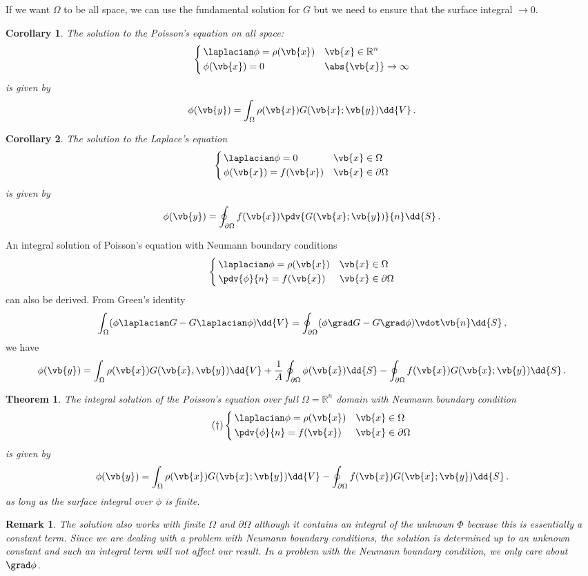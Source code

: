\documentclass{article}
\theoremstyle{plain}\theoremheaderfont{\normalfont\itshape}\theorembodyfont{\rmfamily}\theoremseparator{.}\newtheorem*{rem}{Remark}\newtheorem*{ex}{Example}\newtheorem*{proof}{Proof}\newtheorem*{altp}{Alternative proof}
\theoremstyle{plain}\theoremheaderfont{\normalfont\bfseries}\theorembodyfont{\rmfamily}\theoremseparator{.}\newtheorem{thm}{Theorem}[section]\newtheorem{lem}[thm]{Lemma}\newtheorem{prop}[thm]{Proposition}\newtheorem*{cor}{Corollary}\newtheorem{defn}[thm]{Definition}\newtheorem{clm}[thm]{Claim}\newtheorem{clminproof}{Claim}
\theoremstyle{break}\theoremheaderfont{\normalfont\itshape}\theorembodyfont{\rmfamily}\theoremseparator{.\medskip}\newtheorem*{proofskip}{Proof}\newtheorem*{exs}{Examples}\newtheorem*{rems}{Remarks}
\theoremstyle{break}\theoremheaderfont{\normalfont\bfseries}\theorembodyfont{\rmfamily}\theoremseparator{.\medskip}\newtheorem{lemskip}[thm]{Lemma}\newtheorem{defnskip}[thm]{Definition}\newtheorem{propskip}[thm]{Proposition}\newtheorem{thmskip}[thm]{Theorem}
\numberwithin{equation}{section}
\begin{document}
	If we want \(\Omega\) to be all space, we can use the fundamental solution for \(G\) but we need to ensure that the surface integral \(\to 0\).
	\begin{cor}
		The solution to the Poisson's equation on all space:
		\[\left\{\begin{aligned}
			&\,\laplacian\phi=\rho(\vb{x}) && \vb{x}\in\mathbb{R}^n\\
			&\,\phi(\vb{x})=0 && \abs{\vb{x}}\to\infty
		\end{aligned}\right.\]
		is given by
		\[\phi(\vb{y})=\int_\Omega\rho(\vb{x})G(\vb{x};\vb{y})\dd{V}\,.\]
	\end{cor}
	\begin{cor}
		The solution to the Laplace's equation
		\[\left\{\begin{aligned}
			&\,\laplacian\phi=0 && \vb{x}\in\Omega\\
			&\,\phi(\vb{x})=f(\vb{x}) && \vb{x}\in\partial\Omega
		\end{aligned}\right.\]
		is given by
		\[\phi(\vb{y})=\oint_{\partial\Omega}f(\vb{x})\pdv{G(\vb{x};\vb{y})}{n}\dd{S}\,.\]
	\end{cor}

	An integral solution of Poisson's equation with Neumann boundary conditions
	\[\left\{\begin{aligned}
		&\,\laplacian\phi=\rho(\vb{x}) && \vb{x}\in\Omega\\
		&\,\pdv{\phi}{n}=f(\vb{x}) && \vb{x}\in\partial\Omega
	\end{aligned}\right.\]
	can also be derived. From Green's identity
	\[\int_\Omega(\phi\laplacian G-G\laplacian\phi)\dd{V}=\oint_{\partial\Omega}(\phi\grad G-G\grad\phi)\vdot\vb{n}\dd{S}\,,\]
	we have
	\[\phi(\vb{y})=\int_\Omega\rho(\vb{x})G(\vb{x},\vb{y})\dd{V}+\frac{1}{A}\oint_{\partial\Omega}\phi(\vb{x})\dd{S}-\oint_{\partial\Omega}f(\vb{x})G(\vb{x};\vb{y})\dd{S}\,.\]
	\begin{thm}
		The integral solution of the Poisson's equation over full \(\Omega=\mathbb{R}^n\) domain with Neumann boundary condition
		\begin{equation}\tag{\(\dagger\)}
			\left\{\begin{aligned}
				&\,\laplacian\phi=\rho(\vb{x}) && \vb{x}\in\Omega\\
				&\,\pdv{\phi}{n}=f(\vb{x}) && \vb{x}\in\partial\Omega
			\end{aligned}\right.
		\end{equation}
		is given by
		\[\phi(\vb{y})=\int_\Omega\rho(\vb{x})G(\vb{x};\vb{y})\dd{V}-\oint_{\partial\Omega}f(\vb{x})G(\vb{x};\vb{y})\dd{S}\,.\]
		as long as the surface integral over \(\phi\) is finite.
	\end{thm}
	\begin{rem}
		The solution also works with finite \(\Omega\) and \({\partial\Omega}\) although it contains an integral of the unknown \(\Phi\) because this is essentially a constant term. Since we are dealing with a problem with Neumann boundary conditions, the solution is determined up to an unknown constant and such an integral term will not affect our result. In a problem with the Neumann boundary condition, we only care about \(\grad\phi\).
	\end{rem}
\end{document}
